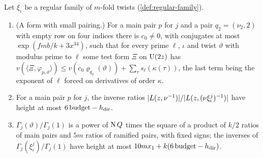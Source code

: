 \begin{theorem}\label{thm:twisted-value-heights}
Let $\xi_\iota$ be a regular family of $m$-fold twists (\cref{def:regular-family}).
\begin{enumerate}[label=\textup{(\alph*)}]
\item (A form with small pairing.) For a main pair $p$ for $j$ and a pair $q_2=(\nu_2,2)$ with empty row on four indices there is $c_0\ne0$, with conjugates at most $\exp(fmb/k+3x^{34})$, such that for every prime $\ell$,
$\iota$ and twist $\vartheta$ with modulus prime to $\ell$ some test form $\Xi$ on $\operatorname{U}(2z)$ has $v(\langle\Xi,\varphi_{p,\vartheta}\rangle)\le v(c_0\varrho_{q_2}(\vartheta))+\sum_\tau s_\ell(\kappa(\tau))$, the last term being the exponent of $\ell$ forced on
derivatives of order $\kappa$.
\item For a main pair $p$ for $j$, the inverse ratios $\lvert L(z,\nu^{-1})\rvert/\lvert L(z,(\nu\xi_\iota^j)^{-1})\rvert$ have height at most $6\,\mathrm{budget}-h_{\mathrm{dir}}$.
\item $\Gamma_j(\vartheta)/\Gamma_j(1)$ is a power of $\operatorname{N} Q$ times the square of a product of $k/2$ ratios of main pairs and $5m$ ratios of ramified pairs, with fixed signs; the inverses of
$\Gamma_j(\xi^j_\iota)/\Gamma_j(1)$ have height at most $10mx_1+k(6\,\mathrm{budget}-h_{\mathrm{dir}})$.
\end{enumerate}
\end{theorem}

